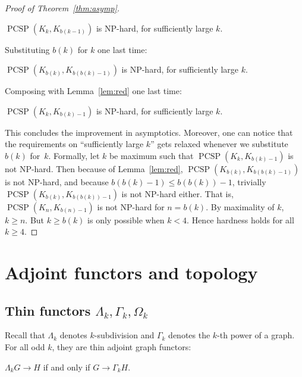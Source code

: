 \documentclass[11pt,a4paper]{scrartcl}
\numberwithin{theorem}{section}
\theoremstyle{definition}
\DeclareMathOperator{\PCSP}{PCSP}
\begin{document}
\begin{proof}[Proof of Theorem~\ref{thm:asymp}]
	\begin{center}
	$\PCSP(K_{k}, K_{b(k-1)})$ is NP-hard, for sufficiently large $k$.
	\end{center}
	Substituting $b(k)$ for $k$ one last time:
	\begin{center}
	$\PCSP(K_{b(k)}, K_{b(b(k)-1)})$ is NP-hard, for sufficiently large $k$.
	\end{center}
	Composing with Lemma~\ref{lem:red} one last time:
	\begin{center}
	$\PCSP(K_{k}, K_{b(k)-1})$ is NP-hard, for sufficiently large $k$.
	\end{center}
	This concludes the improvement in asymptotics.
	Moreover, one can notice that the requirements on ``sufficiently large $k$'' gets
	relaxed whenever we substitute $b(k)$ for~$k$.
	Formally,
	let $k$ be maximum such that $\PCSP(K_{k}, K_{b(k)-1})$ is not NP-hard.
	Then because of Lemma~\ref{lem:red}, $\PCSP(K_{b(k)}, K_{b(b(k)-1)})$ is not NP-hard,
	and because $b(b(k)-1) \leq b(b(k))-1$, trivially $\PCSP(K_{b(k)}, K_{b(b(k))-1})$ is not NP-hard either.
	That is, $\PCSP(K_n,K_{b(n)-1})$ is not NP-hard for $n=b(k)$.
	By maximality of $k$, $k \geq n$. But $k \geq b(k)$ is only possible when $k < 4$.
	Hence hardness holds for all $k \geq 4$.
\end{proof}





\section{Adjoint functors and topology}\label{sec:functors}
\subsection{\texorpdfstring{Thin functors $\Lambda_k,\Gamma_k,\Omega_k$}{Thin functors}}
\label{subsec:secondMainProof}
Recall that $\Lambda_k$ denotes $k$-subdivision and $\Gamma_k$ denotes the $k$-th power of a graph.
For all odd $k$, they are thin adjoint graph functors:
\begin{center}
	$\Lambda_k G \to H$ if and only if $G \to \Gamma_k H$.
\end{center}
\end{document}
